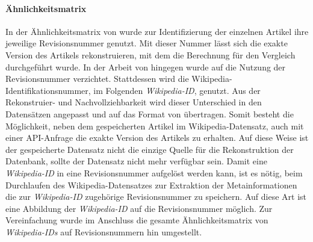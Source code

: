\paragraph{Ähnlichkeitsmatrix}
In der Ähnlichkeitsmatrix von \cite{riehmann2016visualizing} wurde zur Identifizierung der einzelnen Artikel ihre jeweilige Revisionsnummer genutzt.
Mit dieser Nummer lässt sich die exakte Version des Artikels rekonstruieren, mit dem die Berechnung für den Vergleich durchgeführt wurde.
In der Arbeit von \cite{licht:2017} hingegen wurde auf die Nutzung der Revisionsnummer verzichtet. Stattdessen wird die Wikipedia-Identifikationsnummer, im Folgenden \emph{Wikipedia-ID}, genutzt.
Aus der Rekonstruier- und Nachvollziehbarkeit wird dieser Unterschied in den Datensätzen angepasst und auf das Format von \cite{riehmann2016visualizing} übertragen.
Somit besteht die Möglichkeit, neben dem gespeicherten Artikel im Wikipedia-Datensatz, auch mit einer API-Anfrage die exakte Version des Artikels zu erhalten.
Auf diese Weise ist der gespeicherte Datensatz nicht die einzige Quelle für die Rekonstruktion der Datenbank, sollte der Datensatz nicht mehr verfügbar sein.
Damit eine \emph{Wikipedia-ID} in eine Revisionsnummer aufgelöst werden kann, ist es nötig, beim Durchlaufen des Wikipedia-Datensatzes zur Extraktion der Metainformationen die zur \emph{Wikipedia-ID} zugehörige Revisionsnummer zu speichern.
Auf diese Art ist eine Abbildung der \emph{Wikipedia-ID} auf die Revisionsnummer möglich.
Zur Vereinfachung wurde im Anschluss die gesamte Ähnlichkeitsmatrix von \emph{Wikipedia-IDs} auf Revisionsnummern hin umgestellt.

